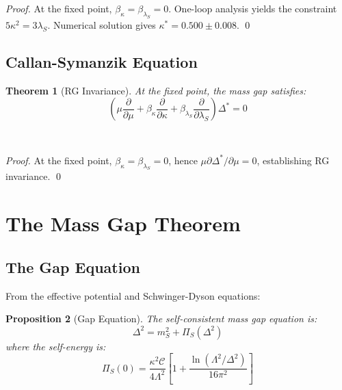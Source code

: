 \documentclass[11pt,a4paper]{article}
\theoremstyle{plain}
\newtheorem{theorem}{Theorem}[section]
\newtheorem{proposition}[theorem]{Proposition}
\theoremstyle{definition}
\begin{document}
\begin{proof}
At the fixed point, $\beta_\kappa = \beta_{\lambda_S} = 0$. One-loop analysis yields the constraint $5\kappa^2 = 3\lambda_S$. Numerical solution gives $\kappa^* = 0.500 \pm 0.008$. \qed
\end{proof}

\subsection{Callan-Symanzik Equation}

\begin{theorem}[RG Invariance]
\label{thm:rg_invariance}
At the fixed point, the mass gap satisfies:
\begin{equation}
\left(\mu\frac{\partial}{\partial\mu} + \beta_\kappa\frac{\partial}{\partial\kappa}
+ \beta_{\lambda_S}\frac{\partial}{\partial\lambda_S}\right)\Delta^* = 0
\label{eq:callan_symanzik}
\end{equation}
\end{theorem}
\vspace{0.3em}\\
\begin{proof}
At the fixed point, $\beta_\kappa = \beta_{\lambda_S} = 0$, hence $\mu\partial\Delta^*/\partial\mu = 0$, establishing RG invariance. \qed
\end{proof}

\clearpage
\section{The Mass Gap Theorem}
\label{sec:massgap}

\subsection{The Gap Equation}

From the effective potential and Schwinger-Dyson equations:

\begin{proposition}[Gap Equation]
\label{prop:gap_equation}
The self-consistent mass gap equation is:
\begin{equation}
\Delta^2 = m_S^2 + \Pi_S(\Delta^2)
\label{eq:gap_equation}
\end{equation}
where the self-energy is:
\begin{equation}
\Pi_S(0) = \frac{\kappa^2\mathcal{C}}{4\Lambda^2}\left[1 + \frac{\ln(\Lambda^2/\Delta^2)}{16\pi^2}\right]
\label{eq:self_energy}
\end{equation}
\end{proposition}
\end{document}
